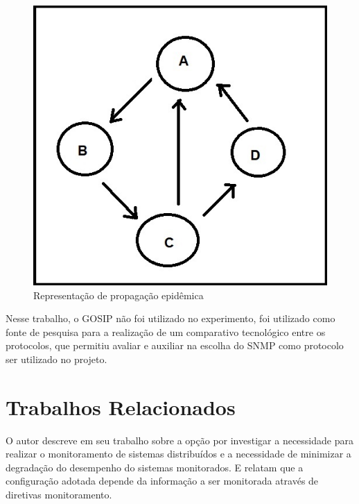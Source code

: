\begin{figure}[h!]
	\begin{center}
	\includegraphics[scale = 0.90]{img/gosip.jpg}
		\caption{Representação de propagação epidêmica   }
		\label{fun:fig:gosip}
	\end{center}
\end{figure}

Nesse trabalho, o \acrshort{GOSIP} não foi utilizado no experimento, foi utilizado como fonte de pesquisa para a realização de um comparativo tecnológico entre os protocolos, que permitiu avaliar e auxiliar na escolha do \acrshort{SNMP} como protocolo ser utilizado no projeto. 


\section{Trabalhos Relacionados}

O autor \cite{abdu1996monitoring} descreve em seu trabalho sobre a opção por investigar a necessidade para realizar o monitoramento de sistemas distribuídos e a necessidade de minimizar a degradação do desempenho do sistemas monitorados. E relatam que a configuração adotada depende da informação a ser monitorada através de diretivas monitoramento.

